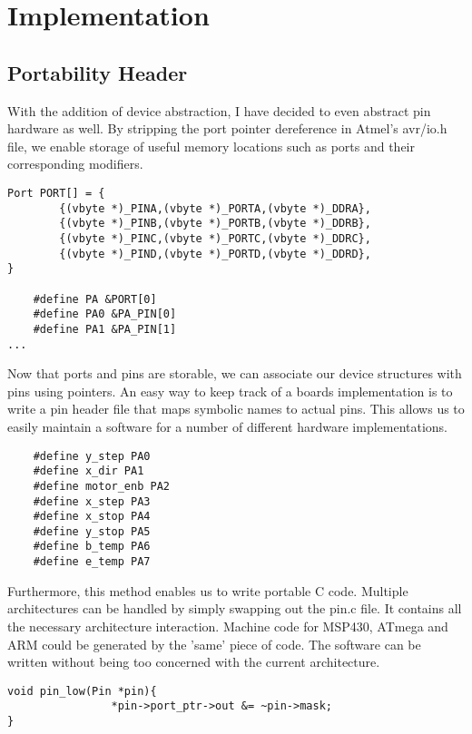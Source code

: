 \documentclass[a4paper, 11pt, twoside]{Thesis}  %
\begin{document}
\section{Implementation}

\subsection{Portability Header}

With the addition of device abstraction, I have decided to even abstract pin hardware as well. By stripping the port pointer dereference in Atmel's avr/io.h file, we enable storage of useful memory locations such as ports and their corresponding modifiers.

\begin{lstlisting}
Port PORT[] = {
        {(vbyte *)_PINA,(vbyte *)_PORTA,(vbyte *)_DDRA},
        {(vbyte *)_PINB,(vbyte *)_PORTB,(vbyte *)_DDRB},
        {(vbyte *)_PINC,(vbyte *)_PORTC,(vbyte *)_DDRC},
        {(vbyte *)_PIND,(vbyte *)_PORTD,(vbyte *)_DDRD},
}

	#define PA &PORT[0]
	#define PA0 &PA_PIN[0]
	#define PA1 &PA_PIN[1]
...

\end{lstlisting}

Now that ports and pins are storable, we can associate our device structures with pins using pointers. An easy way to keep track of a boards implementation is to write a pin header file that maps symbolic names to actual pins. This allows us to easily maintain a software for a number of different hardware implementations.

\begin{lstlisting}
	#define y_step PA0
	#define x_dir PA1
	#define motor_enb PA2
	#define x_step PA3
	#define x_stop PA4
	#define y_stop PA5
	#define b_temp PA6
	#define e_temp PA7

\end{lstlisting}

Furthermore, this method enables us to write portable C code. Multiple architectures can be handled by simply swapping out the pin.c file. It contains all the necessary architecture interaction. Machine code for MSP430, ATmega and ARM could be generated by the 'same' piece of code. The software can be written without being too concerned with the current architecture.

\begin{lstlisting}
void pin_low(Pin *pin){
                *pin->port_ptr->out &= ~pin->mask;
}

\end{lstlisting}
\end{document}
